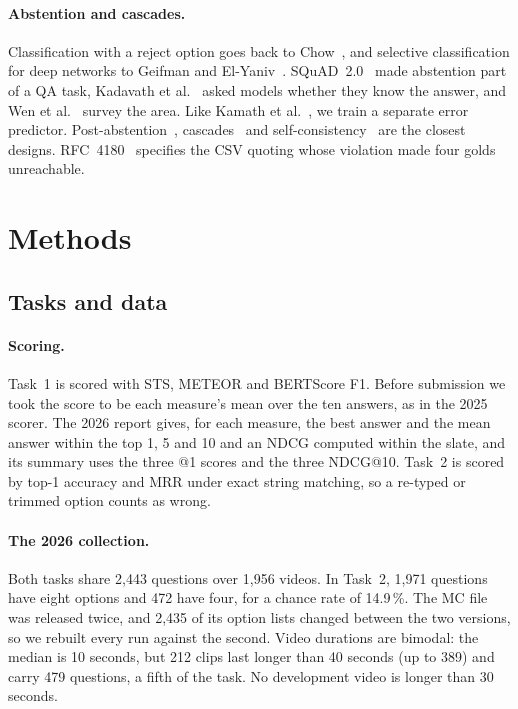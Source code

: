 \documentclass[sigconf,nonacm]{acmart}
\begin{document}
\paragraph{Abstention and cascades.}
Classification with a reject option goes back to Chow~\cite{chow1970reject}, and
selective classification for deep networks to Geifman and
El-Yaniv~\cite{geifman2017selective}. SQuAD~2.0~\cite{rajpurkar2018squad2} made
abstention part of a QA task, Kadavath et al.~\cite{kadavath2022know} asked models
whether they know the answer, and Wen et al.~\cite{wen2025abstention} survey the
area. Like Kamath et al.~\cite{kamath2020selective}, we train a separate error
predictor. Post-abstention~\cite{varshney2023postabstention},
cascades~\cite{chen2023frugalgpt} and self-consistency~\cite{wang2023selfconsistency}
are the closest designs. RFC~4180~\cite{rfc4180} specifies the CSV quoting whose
violation made four golds unreachable.

\section{Methods}
\label{sec:methods}

\subsection{Tasks and data}
\label{sec:data}

\paragraph{Scoring.}
Task~1 is scored with STS, METEOR and BERTScore F1. Before submission we took the
score to be each measure's mean over the ten answers, as in the 2025 scorer. The
2026 report gives, for each measure, the best answer and the mean answer within
the top 1, 5 and 10 and an NDCG computed within the slate, and its summary uses
the three @1 scores and the three NDCG@10. Task~2 is scored by top-1 accuracy and
MRR under exact string matching, so a re-typed or trimmed option counts as wrong.

\paragraph{The 2026 collection.}
Both tasks share 2,443 questions over 1,956 videos. In Task~2, 1,971 questions
have eight options and 472 have four, for a chance rate of 14.9\,\%. The MC file
was released twice, and 2,435 of its option lists changed between the two
versions, so we rebuilt every run against the second. Video durations are
bimodal: the median is 10 seconds, but 212 clips last longer than 40 seconds (up
to 389) and carry 479 questions, a fifth of the task. No development video is
longer than 30 seconds.
\end{document}

